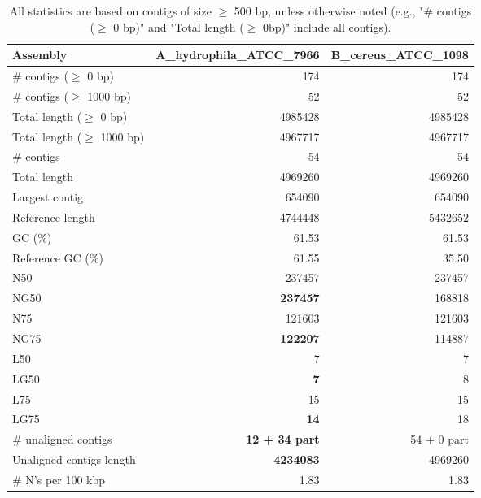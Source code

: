 \documentclass[12pt,a4paper]{article}
\begin{document}
\begin{table}[ht]
\begin{center}
\caption{All statistics are based on contigs of size $\geq$ 500 bp, unless otherwise noted (e.g., "\# contigs ($\geq$ 0 bp)" and "Total length ($\geq$ 0bp)" include all contigs).}
\begin{tabular}{|l*{2}{|r}|}
\hline
Assembly & A\_hydrophila\_ATCC\_7966 & B\_cereus\_ATCC\_1098 \\ \hline
\# contigs ($\geq$ 0 bp) & 174 & 174 \\ \hline
\# contigs ($\geq$ 1000 bp) & 52 & 52 \\ \hline
Total length ($\geq$ 0 bp) & 4985428 & 4985428 \\ \hline
Total length ($\geq$ 1000 bp) & 4967717 & 4967717 \\ \hline
\# contigs & 54 & 54 \\ \hline
Total length & 4969260 & 4969260 \\ \hline
Largest contig & 654090 & 654090 \\ \hline
Reference length & 4744448 & 5432652 \\ \hline
GC (\%) & 61.53 & 61.53 \\ \hline
Reference GC (\%) & 61.55 & 35.50 \\ \hline
N50 & 237457 & 237457 \\ \hline
NG50 & {\bf 237457} & 168818 \\ \hline
N75 & 121603 & 121603 \\ \hline
NG75 & {\bf 122207} & 114887 \\ \hline
L50 & 7 & 7 \\ \hline
LG50 & {\bf 7} & 8 \\ \hline
L75 & 15 & 15 \\ \hline
LG75 & {\bf 14} & 18 \\ \hline
\# unaligned contigs & {\bf 12 + 34 part} & 54 + 0 part \\ \hline
Unaligned contigs length & {\bf 4234083} & 4969260 \\ \hline
\# N's per 100 kbp & 1.83 & 1.83 \\ \hline
\end{tabular}
\end{center}
\end{table}
\end{document}
